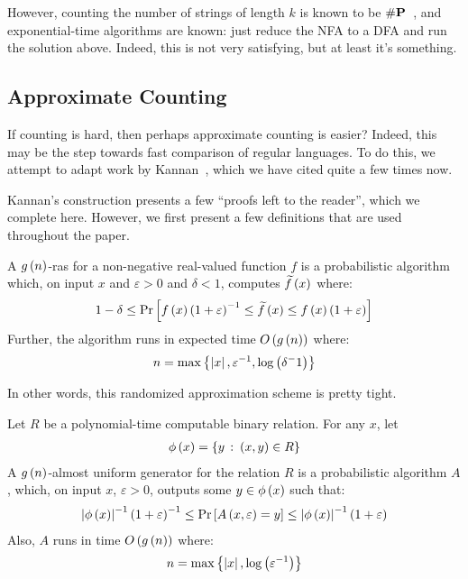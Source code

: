 \documentclass[12pt]{article}
\begin{document}
However, counting the number of strings of length \(k\) is known to be
\(\mathbf{\#P}\)~\cite{acmsiam-kannan1995counting},
and exponential-time algorithms are known:
just reduce the NFA to a DFA and run the solution above.
Indeed, this is not very satisfying, but at least it's something.

\subsection{Approximate Counting}
If counting is hard, then perhaps approximate counting is easier?
Indeed, this may be the step towards fast comparison of regular languages.
To do this,
we attempt to adapt work by Kannan~\cite{acmsiam-kannan1995counting},
which we have cited quite a few times now.

Kannan's construction presents a few ``proofs left to the reader'',
which we complete here.
However, we first present a few definitions that are used throughout
the paper.

\begin{definition}
  A \(g\left(n\right)\)-ras for a non-negative real-valued function
  \(f\) is a probabilistic algorithm which,
  on input \(x\) and \(\varepsilon > 0\) and \(\delta < 1\),
  computes \(\widetilde{f}\left(x\right)\) where:
  \begin{align*}
    1 - \delta \leq
    \mathrm{Pr}\left[
      f\left(x\right) \left(1 + \varepsilon\right)^{-1}
        \leq \widetilde{f}\left(x\right)
        \leq f\left(x\right) \left(1 + \varepsilon\right)\right]
  \end{align*}
  Further, the algorithm runs in expected time \(O\left(g\left(n\right)\right)\)
  where:
  \begin{align*}
    n = \max\left\{\left\lvert x\right\rvert, \varepsilon^{-1}, \log\left(\delta^-1\right)\right\}
  \end{align*}
\end{definition}

In other words, this randomized approximation scheme is pretty tight.

\begin{definition}
  Let \(R\) be a polynomial-time computable binary relation.
  For any \(x\), let
  \begin{align*}
    \phi\left(x\right) = \left\{y \ \colon \left(x, y\right) \in R\right\}
  \end{align*}
  A \(g\left(n\right)\)-almost uniform generator for the relation
  \(R\) is a probabilistic algorithm \(A\),
  which, on input \(x\), \(\varepsilon > 0\),
  outputs some \(y \in \phi\left(x\right)\) such that:
  \begin{align*}
    \left\lvert\phi\left(x\right)\right\rvert^{-1} \left(1 + \varepsilon\right)^{-1}
      \leq \mathrm{Pr}\left[A\left(x, \varepsilon\right) = y\right]
      \leq \left\lvert\phi\left(x\right)\right\rvert^{-1} \left(1 + \varepsilon\right)
  \end{align*}
  Also, \(A\) runs in time \(O\left(g\left(n\right)\right)\)
  where:
  \begin{align*}
    n = \max\left\{\left\lvert x\right\rvert, \log\left(\varepsilon^{-1}\right)\right\}
  \end{align*}
\end{definition}
\end{document}
